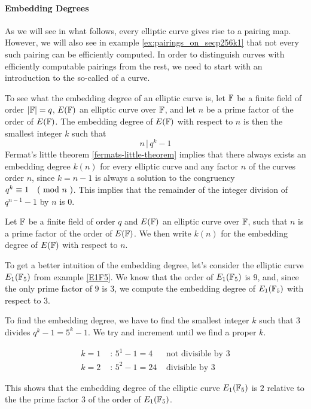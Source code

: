 \paragraph{Embedding Degrees} As we will see in what follows, every elliptic curve gives rise to a pairing map. However, we will also see in example \ref{ex:pairings_on_secp256k1} that not every such pairing can be efficiently computed. In order to distinguish curves with efficiently computable pairings from the rest, we need to start with an introduction to the so-called  of a curve. 

To see what the embedding degree of an elliptic curve is, let $\mathbb{F}$ be a finite field of order $|\mathbb{F}|=q$, $E(\mathbb{F})$ an elliptic curve over $\mathbb{F}$, and let $n$ be a prime factor of the order of $E(\mathbb{F})$. The embedding degree of $E(\mathbb{F})$ with respect to $n$ is then the smallest integer $k$ such that
\begin{equation}
\label{def:embedding-degree}
n\,|\, q^k-1
\end{equation}
Fermat's little theorem \ref{fermats-little-theorem} implies that there always exists an embedding degree $k(n)$ for every elliptic curve and any factor $n$ of the curves order $n$, since $k=n-1$ is always a solution to the congruency $q^{k} \equiv 1 \quad \text{( mod } n \text{ )}$. This implies that the remainder of the integer division of $q^{n-1}-1$ by $n$ is $0$.

\begin{notation} Let $\mathbb{F}$ be a finite field of order $q$ and $E(\mathbb{F})$ an elliptic curve over $\mathbb{F}$, such that $n$ is a prime factor of the order of $E(\mathbb{F})$. We then write $k(n)$ for the embedding degree of $E(\mathbb{F})$ with respect to $n$.
\end{notation}

\begin{example} To get a better intuition of the embedding degree, let's consider the elliptic curve $E_1(\mathbb{F}_5)$ from example \ref{E1F5}. We know that the order of $E_1(\mathbb{F}_5)$ is $9$, and, since the only prime factor of $9$ is $3$, we compute the embedding degree of $E_1(\mathbb{F}_5)$ with respect to $3$. 

To find the embedding degree, we have to find the smallest integer $k$ such that $3$ divides $q^k-1= 5^k-1$. We try and increment until we find a proper $k$. 

\begin{align*}
k=1 &\text{ : } 5^1-1 = 4 & \text{ not divisible by } 3\\ 
k=2 &\text{ : } 5^2-1 = 24 & \text{ divisible by } 3
\end{align*} 

This shows that the embedding degree of the elliptic curve $E_1(\mathbb{F}_5)$ is $2$ relative to the the prime factor $3$ of the order of $E_1(\mathbb{F}_5)$.
\end{example}

